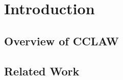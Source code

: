 \section{Introduction}

\subsection{Overview of CCLAW}

\subsection{Related Work}

\cite{mahajan22:_overv_cclaw_l4}

